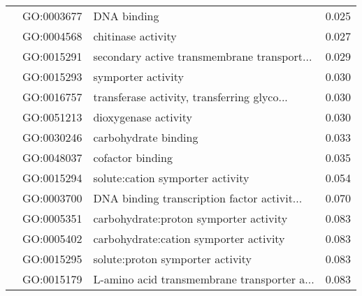 \begin{longtable}{lllr}
   & GO:0003677 &                                  DNA binding &         0.025 \\
   & GO:0004568 &                           chitinase activity &         0.027 \\
   & GO:0015291 &  secondary active transmembrane transport... &         0.029 \\
   & GO:0015293 &                           symporter activity &         0.030 \\
   & GO:0016757 &  transferase activity, transferring glyco... &         0.030 \\
   & GO:0051213 &                         dioxygenase activity &         0.030 \\
   & GO:0030246 &                         carbohydrate binding &         0.033 \\
   & GO:0048037 &                             cofactor binding &         0.035 \\
   & GO:0015294 &             solute:cation symporter activity &         0.054 \\
   & GO:0003700 &  DNA binding transcription factor activit... &         0.070 \\
   & GO:0005351 &       carbohydrate:proton symporter activity &         0.083 \\
   & GO:0005402 &       carbohydrate:cation symporter activity &         0.083 \\
   & GO:0015295 &             solute:proton symporter activity &         0.083 \\
   & GO:0015179 &  L-amino acid transmembrane transporter a... &         0.083 \\
\end{longtable}
